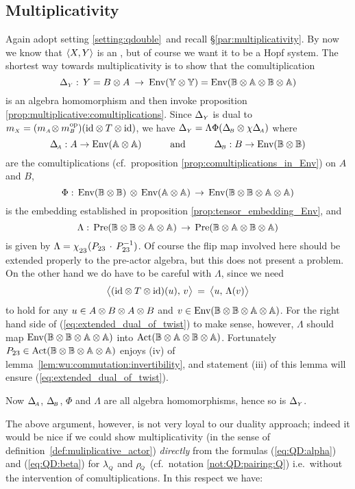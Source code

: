 
\subsection{Multiplicativity}

Again adopt setting \ref{setting:qdouble}\ and recall \S \ref{par:multiplicativity}\@.
By now we know that $\pair{X}{Y}$ is an \idpa, but of course we want it to be a Hopf system.
The shortest way towards multiplicativity is to show that the comultiplication
$$ \DeltaY: \, Y = B\tens A \:\rarr\: \Env(\YY \tens \YY)
                 = \Env(\BBAA \tens \BBAA) $$
is an algebra homomorphism and then invoke proposition \ref{prop:multiplicative:comultiplications}\@.
Since $\DeltaY$ is dual to
$\mult{X} = (\mult{A} \! \tens  \mult{B}\op)(\id \tens T \tens \id)$, we have
$\DeltaY  = \Lambda \Phi (\DeltaB \tens \flip\DeltaA)$
where
$$ \DeltaA : A \rarr \Env(\AAAA)     \andspace{3em}
   \DeltaB : B \rarr \Env(\BBBB) $$
are the comultiplications (cf.\ proposition \ref{prop:comultiplications_in_Env}) on $A$ and $B$,
$$ \Phi :\, \Env(\BBBB) \,\tens\, \Env(\AAAA)  \,\rarr\,  \Env(\BBBB \tens \AAAA) $$
is the embedding established in proposition \ref{prop:tensor_embedding_Env}, and
$$ \Lambda :\, \Pre(\BBBB \tens \AAAA)  \,\rarr\,  \Pre(\BBAA \tens \BBAA) $$
is given by
$\Lambda = \flipsub{23}(P_{23} \,\cdot\, P^{-1}_{23})$.
Of course the flip map involved here should be extended properly
to the pre-actor algebra, but this does not present a problem.
On the other hand we do have to be careful with $\Lambda$, since we need
\begin{equation}\label{eq:extended_dual_of_twist}
  \pairM{(\id \tens T \tens \id)(u)}{v}  \:=\:  \pairM{u}{\Lambda(v)}
\end{equation}
to hold for any $u \in A \tens B \tens A \tens B$ and $v \in \Env(\BBBB \tens \AAAA)$.
For the right hand side of (\ref{eq:extended_dual_of_twist}) to make
sense, however, $\Lambda$ should map $\Env(\BBBB \tens \AAAA)$ into $\Act(\BBAA \tens \BBAA)$.
Fortunately $P_{23} \in \Act(\BBBB \tens \AAAA)$ enjoys (iv) of
\mbox{lemma \ref{lem:wu:commutation:invertibility}},
and statement (iii) of this lemma will ensure (\ref{eq:extended_dual_of_twist}).

Now $\DeltaA$, $\DeltaB$, $\Phi$ and $\Lambda$ are all algebra homomorphisms,
hence so is $\DeltaY$.
\vspace{2ex}

The above argument, however, is not very loyal to our duality approach;
indeed it would be nice if we could show multiplicativity
(in the sense of \mbox{definition \ref{def:muliplicative_actor}}) {\em directly\/} from
the formulas (\ref{eq:QD:alpha}) and (\ref{eq:QD:beta}) for $\lQ$ and $\rQ$
(cf.\ notation \ref{not:QD:pairing:Q})
i.e.\ without the intervention of comultiplications. In this respect we have:

